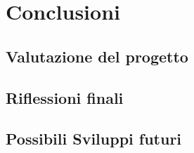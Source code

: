 \chapter{Conclusioni}
\label{chap:conclusioni}

\section{Valutazione del progetto}

\section{Riflessioni finali}

\section{Possibili Sviluppi futuri}